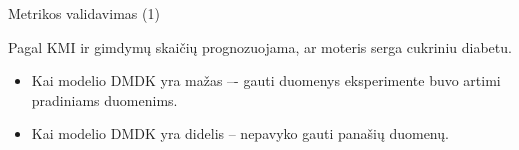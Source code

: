 \begin{frame}[c]{Metrikos validavimas (1)}
 
Pagal KMI ir gimdymų skaičių prognozuojama, ar moteris serga cukriniu diabetu.

\begin{itemize}
    \item Kai modelio DMDK yra mažas –- gauti duomenys eksperimente buvo artimi pradiniams duomenims. 
    \item Kai modelio DMDK yra didelis – nepavyko gauti panašių duomenų.
\end{itemize}



\end{frame}
